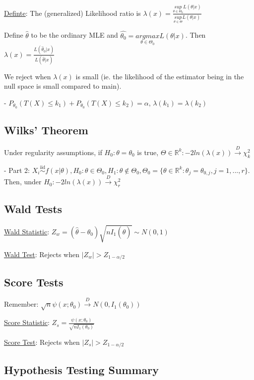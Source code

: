 \documentclass{article}
\newcommand{\real}{\mathbb{R}} %
\newcommand{\dto}{\overset{D}{\to}}
\newcommand{\iiddist}{\overset{\mathrm{iid}}{\sim}}
\begin{document}
\underline{Definte}: The (generalized) Likelihood ratio is $\lambda(x) = \frac{\underset{\theta \in \Theta_0}{sup} L(\theta|x)}{\underset{\theta \in \Theta}{sup} L(\theta|x)}$

Define $\hat{\theta}$ to be the ordinary MLE and $\hat{\theta_0} = \underset{\theta \in \Theta_0}{argmax}L(\theta|x)$. Then $\lambda(x) = \frac{L(\hat{\theta}_0|x)}{L(\hat{\theta}|x)}$

We reject when $\lambda(x)$ is small (ie. the likelihood of the estimator being in the null space is small compared to main).

- $P_{\theta_0}(T(X) \le k_1) + P_{\theta_0}(T(X) \le k_2) = \alpha$, $\lambda(k_1) = \lambda(k_2)$

\subsection{Wilks' Theorem}

Under regularity assumptions, if $H_0: \theta = \theta_0$ is true, $\Theta \in \real^k: -2ln(\lambda(x)) \dto \chi^2_k$

- Part 2: $X_i \iiddist f(x|\theta), H_0: \theta \in \Theta_0, H_1: \theta \notin \Theta_0, \Theta_0 = \{\theta \in \real^k: \theta_j = \theta_{0,j}, j = 1, ..., r\}$. Then, under $H_0: -2ln(\lambda(x)) \dto \chi^2_r$

\subsection{Wald Tests}

\underline{Wald Statistic}: $Z_w = (\hat{\theta} - \theta_0)\sqrt{n I_1(\hat{\theta})} \sim N(0,1)$

\underline{Wald Test}: Rejects when $|Z_w| > Z_{1-\alpha/2}$

\subsection{Score Tests}

Remember: $\sqrt{n} \psi(x;\theta_0) \dto N(0, I_1(\theta_0))$

\underline{Score Statistic}: $Z_s = \frac{\psi(x;\theta_0)}{\sqrt{n I_1(\theta_0)}}$

\underline{Score Test}: Rejects when $|Z_s| > Z_{1-\alpha/2}$

\subsection{Hypothesis Testing Summary}
\end{document}
